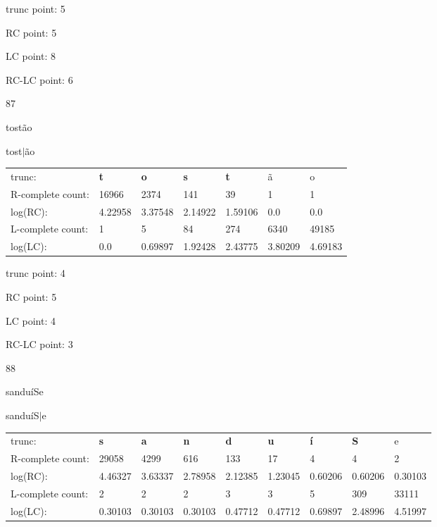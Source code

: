 \documentclass{article}
\begin{document}
trunc point: 5

RC point: 5

LC point: 8

RC-LC point: 6

\vspace{3em}



87

tostão

tost$|$ão

\vspace{1em}

\begin{tabular}{l|llllll}

trunc: & {\color{red}\bf t} & {\color{red}\bf o} & {\color{red}\bf s} & {\color{red}\bf t} & ã & o \\ 
R-complete count: & 16966 & 2374 & 141 & 39 & 1 & 1 \\ 
log(RC): & 4.22958 & 3.37548 & 2.14922 & 1.59106 & 0.0 & 0.0 \\ 
L-complete count: & 1 & 5 & 84 & 274 & 6340 & 49185 \\ 
log(LC): & 0.0 & 0.69897 & 1.92428 & 2.43775 & 3.80209 & 4.69183 \\ 
\end{tabular}

trunc point: 4

RC point: 5

LC point: 4

RC-LC point: 3

\vspace{3em}



88

sanduíSe

sanduíS$|$e

\vspace{1em}

\begin{tabular}{l|llllllll}

trunc: & {\color{red}\bf s} & {\color{red}\bf a} & {\color{red}\bf n} & {\color{red}\bf d} & {\color{red}\bf u} & {\color{red}\bf í} & {\color{red}\bf S} & e \\ 
R-complete count: & 29058 & 4299 & 616 & 133 & 17 & 4 & 4 & 2 \\ 
log(RC): & 4.46327 & 3.63337 & 2.78958 & 2.12385 & 1.23045 & 0.60206 & 0.60206 & 0.30103 \\ 
L-complete count: & 2 & 2 & 2 & 3 & 3 & 5 & 309 & 33111 \\ 
log(LC): & 0.30103 & 0.30103 & 0.30103 & 0.47712 & 0.47712 & 0.69897 & 2.48996 & 4.51997 \\ 
\end{tabular}
\end{document}
